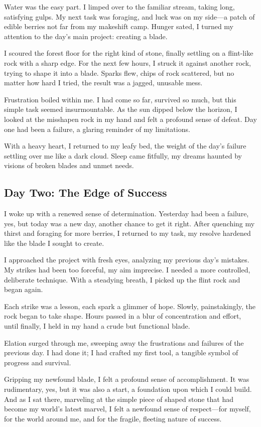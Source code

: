 \documentclass[]{article}
\begin{document}
Water was the easy part. I limped over to the familiar stream, taking long, satisfying gulps. My next task was foraging, and luck was on my side—a patch of edible berries not far from my makeshift camp. Hunger sated, I turned my attention to the day's main project: creating a blade.

I scoured the forest floor for the right kind of stone, finally settling on a flint-like rock with a sharp edge. For the next few hours, I struck it against another rock, trying to shape it into a blade. Sparks flew, chips of rock scattered, but no matter how hard I tried, the result was a jagged, unusable mess.

Frustration boiled within me. I had come so far, survived so much, but this simple task seemed insurmountable. As the sun dipped below the horizon, I looked at the misshapen rock in my hand and felt a profound sense of defeat. Day one had been a failure, a glaring reminder of my limitations.

With a heavy heart, I returned to my leafy bed, the weight of the day's failure settling over me like a dark cloud. Sleep came fitfully, my dreams haunted by visions of broken blades and unmet needs.

\subsection{Day Two: The Edge of Success}

I woke up with a renewed sense of determination. Yesterday had been a failure, yes, but today was a new day, another chance to get it right. After quenching my thirst and foraging for more berries, I returned to my task, my resolve hardened like the blade I sought to create.

I approached the project with fresh eyes, analyzing my previous day's mistakes. My strikes had been too forceful, my aim imprecise. I needed a more controlled, deliberate technique. With a steadying breath, I picked up the flint rock and began again.

Each strike was a lesson, each spark a glimmer of hope. Slowly, painstakingly, the rock began to take shape. Hours passed in a blur of concentration and effort, until finally, I held in my hand a crude but functional blade.

Elation surged through me, sweeping away the frustrations and failures of the previous day. I had done it; I had crafted my first tool, a tangible symbol of progress and survival.

Gripping my newfound blade, I felt a profound sense of accomplishment. It was rudimentary, yes, but it was also a start, a foundation upon which I could build. And as I sat there, marveling at the simple piece of shaped stone that had become my world's latest marvel, I felt a newfound sense of respect—for myself, for the world around me, and for the fragile, fleeting nature of success.
\end{document}

